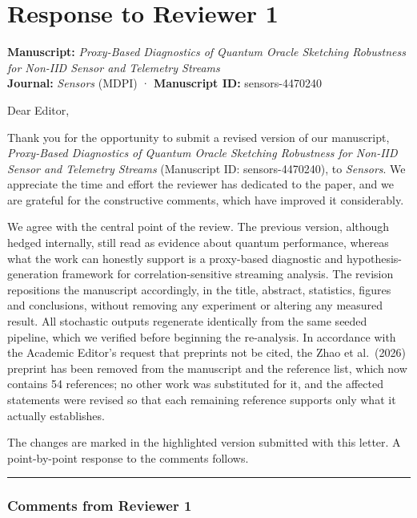 \documentclass[
  11pt,
]{article}
\author{}
\date{}
\begin{document}
\section{Response to Reviewer 1}\label{response-to-reviewer-1}

\textbf{Manuscript:} \emph{Proxy-Based Diagnostics of Quantum Oracle
Sketching Robustness for Non-IID Sensor and Telemetry Streams}\\
\textbf{Journal:} \emph{Sensors} (MDPI) · \textbf{Manuscript ID:}
sensors-4470240

Dear Editor,

Thank you for the opportunity to submit a revised version of our
manuscript, \emph{Proxy-Based Diagnostics of Quantum Oracle Sketching
Robustness for Non-IID Sensor and Telemetry Streams} (Manuscript ID:
sensors-4470240), to \emph{Sensors}. We appreciate the time and effort
the reviewer has dedicated to the paper, and we are grateful for the
constructive comments, which have improved it considerably.

We agree with the central point of the review. The previous version,
although hedged internally, still read as evidence about quantum
performance, whereas what the work can honestly support is a proxy-based
diagnostic and hypothesis-generation framework for correlation-sensitive
streaming analysis. The revision repositions the manuscript accordingly,
in the title, abstract, statistics, figures and conclusions, without
removing any experiment or altering any measured result. All stochastic
outputs regenerate identically from the same seeded pipeline, which we
verified before beginning the re-analysis. In accordance with the
Academic Editor's request that preprints not be cited, the Zhao et
al.~(2026) preprint has been removed from the manuscript and the
reference list, which now contains 54 references; no other work was
substituted for it, and the affected statements were revised so that
each remaining reference supports only what it actually establishes.

The changes are marked in the highlighted version submitted with this
letter. A point-by-point response to the comments follows.

\begin{center}\rule{0.5\linewidth}{0.5pt}\end{center}

\subsubsection{Comments from Reviewer 1}\label{comments-from-reviewer-1}
\end{document}
